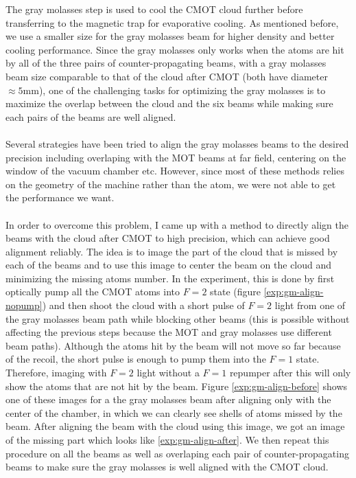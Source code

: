 The gray molasses step is used to cool the CMOT cloud further before transferring to the magnetic trap for evaporative cooling. As mentioned before, we use a smaller size for the gray molasses beam for higher density and better cooling performance. Since the gray molasses only works when the atoms are hit by all of the three pairs of counter-propagating beams, with a gray molasses beam size comparable to that of the cloud after CMOT (both have diameter $\approx5\text{mm}$), one of the challenging tasks for optimizing the gray molasses is to maximize the overlap between the cloud and the six beams while making sure each pairs of the beams are well aligned.\\
\\
Several strategies have been tried to align the gray molasses beams to the desired precision including overlaping with the MOT beams at far field, centering on the window of the vacuum chamber etc. However, since most of these methods relies on the geometry of the machine rather than the atom, we were not able to get the performance we want.\\
\\
In order to overcome this problem, I came up with a method to directly align the beams with the cloud after CMOT to high precision, which can achieve good alignment reliably. The idea is to image the part of the cloud that is missed by each of the beams and to use this image to center the beam on the cloud and minimizing the missing atoms number. In the experiment, this is done by first optically pump all the CMOT atoms into $F=2$ state (figure \ref{exp:gm-align-nopump}) and then shoot the cloud with a short pulse of $F=2$ light from one of the gray molasses beam path while blocking other beams (this is possible without affecting the previous steps because the MOT and gray molasses use different beam paths). Although the atoms hit by the beam will not move so far because of the recoil, the short pulse is enough to pump them into the $F=1$ state. Therefore, imaging with $F=2$ light without a $F=1$ repumper after this will only show the atoms that are not hit by the beam. Figure \ref{exp:gm-align-before} shows one of these images for a the gray molasses beam after aligning only with the center of the chamber, in which we can clearly see shells of atoms missed by the beam. After aligning the beam with the cloud using this image, we got an image of the missing part which looks like \ref{exp:gm-align-after}. We then repeat this procedure on all the beams as well as overlaping each pair of counter-propagating beams to make sure the gray molasses is well aligned with the CMOT cloud.\\
